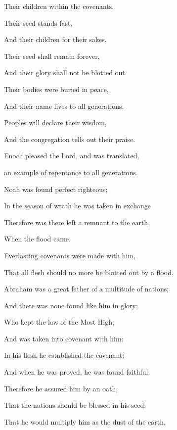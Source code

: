 {\par }{\Q Their children
{}
 within the covenants.
\par }{\Q {}Their seed stands fast,
\par }{\Q And their children for their sakes.
\par }{\Q {}Their seed shall remain forever,
\par }{\Q And their glory shall not be blotted out.
\par }{\Q {}Their bodies were buried in peace,
\par }{\Q And their name lives to all generations.
\par }{\Q {}Peoples will declare their wisdom,
\par }{\Q And the congregation tells out their praise.
\par }{\BB \par }{\Q {}Enoch pleased the Lord, and was translated,
\par }{ an example of repentance to all generations.
\par }{\Q {}Noah was found perfect
{} righteous;
\par }{\Q In the season of wrath he was taken in exchange
{}
\par }{\Q Therefore was there left a remnant to the earth,
\par }{\Q When the flood came.
\par }{\Q {}Everlasting covenants were made with him,
\par }{\Q That all flesh should no more be blotted out by a flood.
\par }{\BB \par }{\Q {}Abraham was a great father of a multitude of nations;
\par }{\Q And there was none found like him in glory;
\par }{\Q {}Who kept the law of the Most High,
\par }{\Q And was taken into covenant with him:
\par }{\Q In his flesh he established the covenant;
\par }{\Q And when he was proved, he was found faithful.
\par }{\BB \par }{\Q {}Therefore he assured him by an oath,
\par }{\Q That the nations should be blessed in his seed;
\par }{\Q That he would multiply him as the dust of the earth,
}
